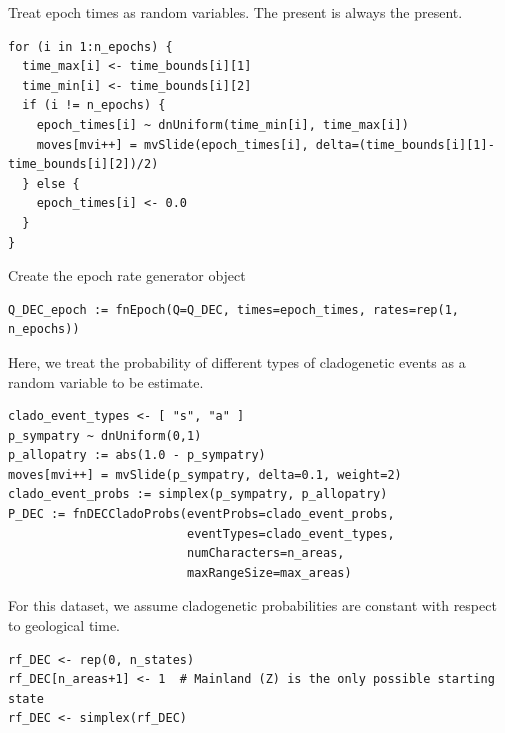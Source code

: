 
Treat epoch times as random variables. The present is always the present.


\begin{snugshade}
\begin{lstlisting}
for (i in 1:n_epochs) {
  time_max[i] <- time_bounds[i][1]
  time_min[i] <- time_bounds[i][2]
  if (i != n_epochs) {
    epoch_times[i] ~ dnUniform(time_min[i], time_max[i])
    moves[mvi++] = mvSlide(epoch_times[i], delta=(time_bounds[i][1]-time_bounds[i][2])/2)
  } else {
    epoch_times[i] <- 0.0
  }
}
\end{lstlisting}
\end{snugshade}




Create the epoch rate generator object
\begin{snugshade}
\begin{lstlisting}
Q_DEC_epoch := fnEpoch(Q=Q_DEC, times=epoch_times, rates=rep(1, n_epochs))
\end{lstlisting}
\end{snugshade}


Here, we treat the probability of different types of cladogenetic events as a random variable to be estimate.

\begin{snugshade}
\begin{lstlisting}
clado_event_types <- [ "s", "a" ]
p_sympatry ~ dnUniform(0,1)
p_allopatry := abs(1.0 - p_sympatry)
moves[mvi++] = mvSlide(p_sympatry, delta=0.1, weight=2)
clado_event_probs := simplex(p_sympatry, p_allopatry)
P_DEC := fnDECCladoProbs(eventProbs=clado_event_probs,
                         eventTypes=clado_event_types,
                         numCharacters=n_areas,
                         maxRangeSize=max_areas)
\end{lstlisting}
\end{snugshade}

For this dataset, we assume cladogenetic probabilities are constant with respect to geological time.



\begin{snugshade}
\begin{lstlisting}
rf_DEC <- rep(0, n_states)
rf_DEC[n_areas+1] <- 1  # Mainland (Z) is the only possible starting state
rf_DEC <- simplex(rf_DEC)
\end{lstlisting}
\end{snugshade}


